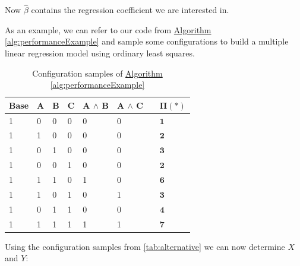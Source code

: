 Now $\hat{\beta}$ contains the regression coefficient we are interested in.

As an example, we can refer to our code from \hyperref[alg:performanceExample]{Algorithm \ref*{alg:performanceExample}}
and sample some configurations to build a multiple linear regression model using ordinary least squares.

\begin{table}[H]
    \centering
    \begin{tabular}{llllllll}
    \hline
    Base & A & B & C & A $\land$ B & A $\land$ C &  & $\bm{\Pi(*)}$ \\ \hline
    1    & 0 & 0 & 0 & 0           & 0           &  &  $\mathbf{1}$   \\
    1    & 1 & 0 & 0 & 0           & 0           &  &  $\mathbf{2}$   \\
    1    & 0 & 1 & 0 & 0           & 0           &  &   $\mathbf{3}$  \\  
    1    & 0 & 0 & 1 & 0           & 0           &  &   $\mathbf{2}$  \\  
    1    & 1 & 1 & 0 & 1           & 0           &  &   $\mathbf{6}$   \\
    1    & 1 & 0 & 1 & 0           & 1           &  &   $\mathbf{3}$  \\  
    1    & 0 & 1 & 1 & 0           & 0           &  &   $\mathbf{4}$  \\  
    1    & 1 & 1 & 1 & 1           & 1           &  &   $\mathbf{7}$  \\ \hline

    \end{tabular}  
    \caption{Configuration samples of \hyperref[alg:performanceExample]{Algorithm \ref*{alg:performanceExample}}}\label{tab:alternative}
\end{table}

Using the configuration samples from \autoref{tab:alternative} we can now determine $\textit{X}$ and $\textit{Y}$:

